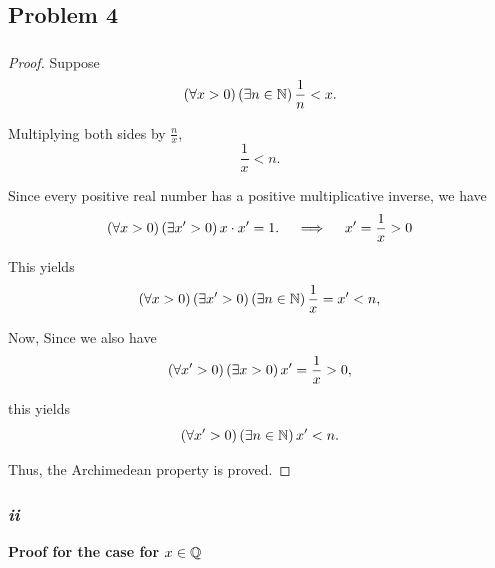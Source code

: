\subsection{Problem 4}
\subsubsection{}
\begin{proof}
    Suppose 
    \begin{equation*}
        \left(\forall x > 0 \right)\left(\exists n \in \mathbb{N} \right) \frac{1}{n} < x. 
    \end{equation*}

    Multiplying both sides by $\frac{n}{x}$, 
    \begin{equation*}
        \frac{1}{x} < n. 
    \end{equation*}

    Since every positive real number has a positive multiplicative inverse, we have
    \begin{equation*}
        \left(\forall x > 0\right)\left(\exists x' > 0\right) x \cdot x' = 1. \quad \implies \quad x' = \frac{1}{x} > 0
    \end{equation*}

    This yields 
    \begin{equation*}
        \left(\forall x > 0\right)\left(\exists x' > 0\right)\left(\exists n \in \mathbb{N}\right) \frac{1}{x} = x' < n, 
    \end{equation*}

    Now, Since we also have 
    \begin{equation*}
        \left(\forall x' > 0 \right)\left(\exists x > 0 \right)x' = \frac{1}{x} > 0, 
    \end{equation*}

    this yields
    \begin{equation*}
        \left(\forall x' > 0 \right)\left(\exists n \in \mathbb{N}\right) x' < n. 
    \end{equation*}

    Thus, the Archimedean property is proved. 
\end{proof}

\newpage
\subsubsection{\it{ii}}
\textbf{Proof for the case for $x \in \mathbb{Q}$}

